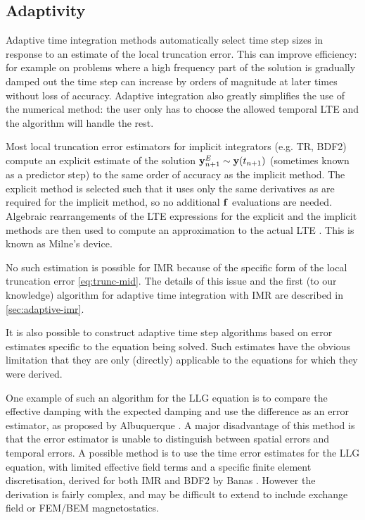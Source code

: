 \subsection{Adaptivity}
\label{sec:adaptivity}

Adaptive time integration methods automatically select time step sizes in response to an estimate of the local truncation error.
This can improve efficiency: for example on problems where a high frequency part of the solution is gradually damped out the time step can increase by orders of magnitude at later times without loss of accuracy.
Adaptive integration also greatly simplifies the use of the numerical method: the user only has to choose the allowed temporal LTE and the algorithm will handle the rest.

Most local truncation error estimators for implicit integrators (e.g. TR, BDF2) compute an explicit estimate of the solution $\boldsymbol{\mathrm{y}}^E_{n+1} \sim \boldsymbol{\mathrm{y}}(t_{n+1})$ (sometimes known as a predictor step) to the same order of accuracy as the implicit method.
The explicit method is selected such that it uses only the same derivatives as are required for the implicit method, so no additional ${\boldsymbol{\mathrm{f}}}$ evaluations are needed.
Algebraic rearrangements of the LTE expressions for the explicit and the implicit methods are then used to compute an approximation to the actual LTE \cite[707-716]{GreshoSani}.
This is known as Milne's device.

No such estimation is possible for IMR because of the specific form of the local truncation error \eqref{eq:trunc-mid}.
The details of this issue and the first (to our knowledge) algorithm for adaptive time integration with IMR are described in \cref{sec:adaptive-imr}.

It is also possible to construct adaptive time step algorithms based on error estimates specific to the equation being solved.
Such estimates have the obvious limitation that they are only (directly) applicable to the equations for which they were derived.

One example of such an algorithm for the LLG equation is to compare the effective damping with the expected damping and use the difference as an error estimator, as proposed by Albuquerque \etal \cite{Albuquerque2001}.
A major disadvantage of this method is that the error estimator is unable to distinguish between spatial errors and temporal errors.
A possible method is to use the time error estimates for the LLG equation, with limited effective field terms and a specific finite element discretisation, derived for both IMR and BDF2 by Banas \cite{Banas-thesis}.
However the derivation is fairly complex, and may be difficult to extend to include exchange field or FEM/BEM magnetostatics.


